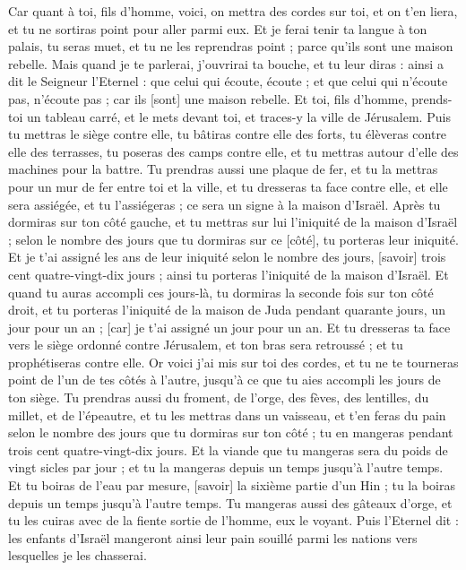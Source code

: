 \begin{multicols}{2}
Car quant à toi, fils d'homme, voici, on mettra des cordes sur toi, et on t'en liera, et tu ne sortiras point pour aller parmi eux.
Et je ferai tenir ta langue à ton palais, tu seras muet, et tu ne les reprendras point ; parce qu'ils sont une maison rebelle.
Mais quand je te parlerai, j'ouvrirai ta bouche, et tu leur diras : ainsi a dit le Seigneur l'Eternel : que celui qui écoute, écoute ; et que celui qui n'écoute pas, n'écoute pas ; car ils [sont] une maison rebelle.
\VerseOne{}Et toi, fils d'homme, prends-toi un tableau carré, et le mets devant toi, et traces-y la ville de Jérusalem.
Puis tu mettras le siège contre elle, tu bâtiras contre elle des forts, tu élèveras contre elle des terrasses, tu poseras des camps contre elle, et tu mettras autour d'elle des machines pour la battre.
Tu prendras aussi une plaque de fer, et tu la mettras pour un mur de fer entre toi et la ville, et tu dresseras ta face contre elle, et elle sera assiégée, et tu l'assiégeras ; ce sera un signe à la maison d'Israël.
Après tu dormiras sur ton côté gauche, et tu mettras sur lui l'iniquité de la maison d'Israël ; selon le nombre des jours que tu dormiras sur ce [côté], tu porteras leur iniquité.
Et je t'ai assigné les ans de leur iniquité selon le nombre des jours, [savoir] trois cent quatre-vingt-dix jours ; ainsi tu porteras l'iniquité de la maison d'Israël.
Et quand tu auras accompli ces jours-là, tu dormiras la seconde fois sur ton côté droit, et tu porteras l'iniquité de la maison de Juda pendant quarante jours, un jour pour un an ; [car] je t'ai assigné un jour pour un an.
Et tu dresseras ta face vers le siège ordonné contre Jérusalem, et ton bras sera retroussé ; et tu prophétiseras contre elle.
Or voici j'ai mis sur toi des cordes, et tu ne te tourneras point de l'un de tes côtés à l'autre, jusqu'à ce que tu aies accompli les jours de ton siège.
Tu prendras aussi du froment, de l'orge, des fèves, des lentilles, du millet, et de l'épeautre, et tu les mettras dans un vaisseau, et t'en feras du pain selon le nombre des jours que tu dormiras sur ton côté ; tu en mangeras pendant trois cent quatre-vingt-dix jours.
Et la viande que tu mangeras sera du poids de vingt sicles par jour ; et tu la mangeras depuis un temps jusqu'à l'autre temps.
Et tu boiras de l'eau par mesure, [savoir] la sixième partie d'un Hin ; tu la boiras depuis un temps jusqu'à l'autre temps.
Tu mangeras aussi des gâteaux d'orge, et tu les cuiras avec de la fiente sortie de l'homme, eux le voyant.
Puis l'Eternel dit : les enfants d'Israël mangeront ainsi leur pain souillé parmi les nations vers lesquelles je les chasserai.

\end{multicols}
